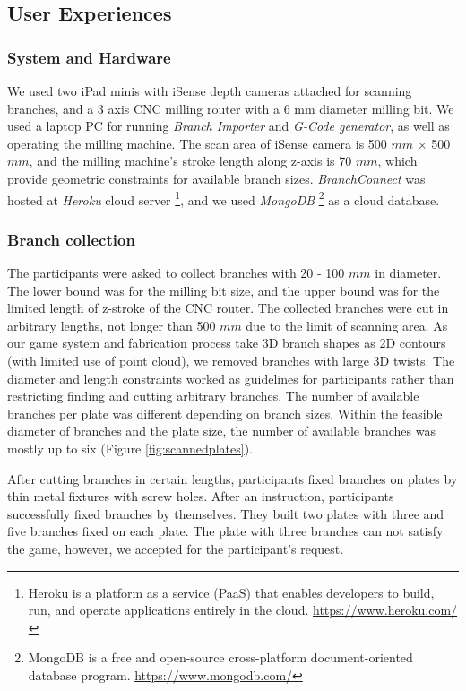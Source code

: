 \subsection{User Experiences}
\subsubsection*{System and Hardware}
We used two iPad minis with iSense depth cameras attached for scanning branches, and a 3 axis CNC milling router with a 6 mm diameter milling bit.
We used a laptop PC for running \textit{Branch Importer} and \textit{G-Code generator}, as well as operating the milling machine.
The scan area of iSense camera is 500 $mm$ $\times$ 500 $mm$, and the milling machine's stroke length along z-axis is 70 $mm$, which provide geometric constraints for available branch sizes.
\textit{BranchConnect} was hosted at \textit{Heroku} cloud server \footnote{Heroku is a platform as a service (PaaS) that enables developers to build, run, and operate applications entirely in the cloud. \url{https://www.heroku.com/}},
and we used \textit{MongoDB} \footnote{MongoDB is a free and open-source cross-platform document-oriented database program. \url{https://www.mongodb.com/}} as a cloud database.

\subsubsection*{Branch collection}
The participants were asked to collect branches with 20 - 100 $mm$ in diameter.
The lower bound was for the milling bit size, and the upper bound was for the limited length of z-stroke of the CNC router.
The collected branches were cut in arbitrary lengths, not longer than 500 $mm$ due to the limit of scanning area.
As our game system and fabrication process take 3D branch shapes as 2D contours (with limited use of point cloud), we removed branches with large 3D twists.
The diameter and length constraints worked as guidelines for participants rather than restricting finding and cutting arbitrary branches.
The number of available branches per plate was different depending on branch sizes.
Within the feasible diameter of branches and the plate size, the number of available branches was mostly up to six (Figure \ref{fig:scannedplates}).

After cutting branches in certain lengths, participants fixed branches on plates by thin metal fixtures with screw holes.
After an instruction, participants successfully fixed branches by themselves.
They built two plates with three and five branches fixed on each plate.
The plate with three branches can not satisfy the game, however, we accepted for the participant's request.

